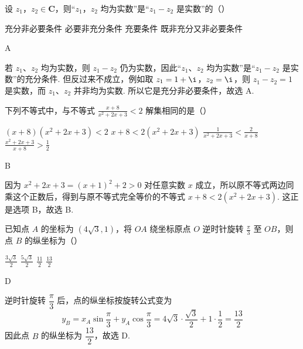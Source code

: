 \begin{problem}
设 \(z_{1}\)，\(z_{2} \in \mathbf{C}\)，则“\(z_{1}\)，\(z_{2}\) 均为实数”是“\(z_{1} - z_{2}\) 是实数”的（\quad）

\choices
    {充分非必要条件}
    {必要非充分条件}
    {充要条件}
    {既非充分又非必要条件}
\end{problem}

\begin{answer}
A
\end{answer}

\begin{solution}
若 \(z_1\)、\(z_2\) 均为实数，则 \(z_1-z_2\) 仍为实数，因此“\(z_1\)、\(z_2\) 均为实数”是“\(z_1-z_2\) 是实数”的充分条件. 但反过来不成立，例如取 \(z_1=1+\i\)，\(z_2=\i\)，则 \(z_1-z_2=1\) 是实数，而 \(z_1\)、\(z_2\) 并非均为实数. 所以它是充分非必要条件，故选 A.
\end{solution}

\begin{problem}
下列不等式中，与不等式 \(\frac{x + 8}{x^2 + 2x + 3} < 2\) 解集相同的是（\quad）

\choices
    {\((x + 8)(x^2 + 2x + 3) < 2\)}
    {\(x + 8 < 2(x^{2} + 2x + 3)\)}
    {\(\frac{1}{x^2 + 2x + 3} < \frac{2}{x + 8}\)}
    {\(\frac{x^2 + 2x + 3}{x + 8} > \frac{1}{2}\)}
\end{problem}

\begin{answer}
B
\end{answer}

\begin{solution}
因为 \(x^2+2x+3=(x+1)^2+2>0\) 对任意实数 \(x\) 成立，所以原不等式两边同乘这个正数后，得到与原不等式完全等价的不等式 \(x+8<2(x^2+2x+3)\). 这正是选项 B，故选 B.
\end{solution}

\begin{problem}
已知点 \(A\) 的坐标为 \((4\sqrt{3}, 1)\)，将 \(OA\) 绕坐标原点 \(O\) 逆时针旋转 \(\frac{\pi}{3}\) 至 \(OB\)，则点 \(B\) 的纵坐标为（\quad）

\choices
    {\(\frac{3\sqrt{3}}{2}\)}
    {\(\frac{5\sqrt{3}}{2}\)}
    {\(\frac{11}{2}\)}
    {\(\frac{13}{2}\)}
\end{problem}

\begin{answer}
D
\end{answer}

\begin{solution}
逆时针旋转 \(\dfrac\pi3\) 后，点的纵坐标按旋转公式变为
\[
y_B=x_A\sin\frac\pi3+y_A\cos\frac\pi3=4\sqrt3\cdot\frac{\sqrt3}{2}+1\cdot\frac12=\frac{13}{2}
\]
因此点 \(B\) 的纵坐标为 \(\dfrac{13}{2}\)，故选 D.
\end{solution}

